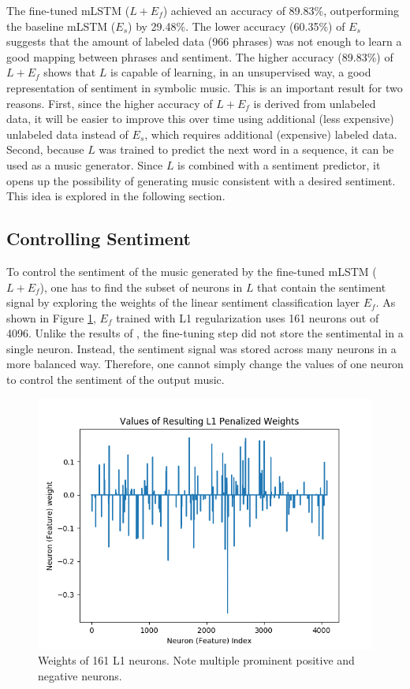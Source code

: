 The fine-tuned mLSTM ($L + E_f$) achieved an accuracy of 89.83\%, outperforming the baseline mLSTM ($E_s$) by 29.48\%. The lower accuracy (60.35\%) of $E_s$ suggests that the amount of labeled data (966 phrases) was not enough to learn a good mapping between phrases and sentiment. The higher accuracy (89.83\%) of $L + E_f$ shows that $L$ is capable of learning, in an unsupervised way, a good representation of sentiment in symbolic music. This is an important result for two reasons. First, since the higher accuracy of $L + E_f$ is derived from unlabeled data, it will be easier to improve this over time using additional (less expensive) unlabeled data instead of $E_s$, which requires additional (expensive) labeled data. Second, because $L$ was trained to predict the next word in a sequence, it can be used as a music generator. Since $L$ is combined with a sentiment predictor, it opens up the possibility of generating music consistent with a desired sentiment. This idea is explored in the following section.

\subsection{Controlling Sentiment}

To control the sentiment of the music generated by the fine-tuned mLSTM ($L + E_f$), one has to find the subset of neurons in $L$ that contain the sentiment signal by exploring the weights of the linear sentiment classification layer $E_f$. As shown in Figure \ref{fig:final_weights}, $E_f$ trained with L1 regularization uses 161 neurons out of 4096. Unlike the results of \citet{radford_2017}, the fine-tuning step did not store the sentimental in a single neuron. Instead, the sentiment signal was stored across many neurons in a more balanced way. Therefore, one cannot simply change the values of one neuron to control the sentiment of the output music.

\begin{figure}[!h]
 \centering
 \includegraphics[width=\columnwidth]{imgs/ismir19/weights.png}
 \caption{Weights of 161 L1 neurons. Note multiple prominent positive and negative neurons.}
 \label{fig:final_weights}
\end{figure}

